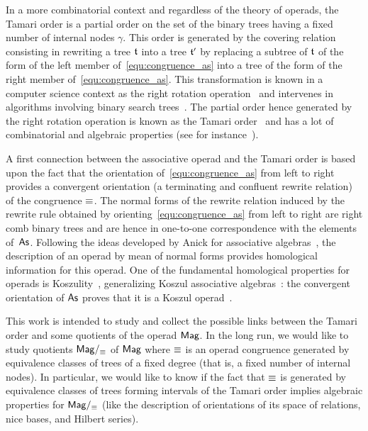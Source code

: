 In a more combinatorial context and regardless of the theory of operads,
the Tamari order is a partial order on the set of the binary trees
having a fixed number of internal nodes $\gamma$. This order is
generated by the covering relation consisting in rewriting a tree $\mathfrak{t}$
into a tree $\mathfrak{t}'$ by replacing a subtree of $\mathfrak{t}$ of the form of the
left member of~\eqref{equ:congruence_as} into a tree of the form of the
right member of~\eqref{equ:congruence_as}. This transformation is known
in a computer science context as the right rotation
operation~\cite{Knu98} and intervenes in algorithms involving binary
search trees~\cite{AVL62}. The partial order hence generated by the
right rotation operation is known as the Tamari order~\cite{Tam62} and
has a lot of combinatorial and algebraic properties (see for
instance~\cite{HT72,Cha06}).
\medbreak

A first connection between the associative operad and the Tamari order
is based upon the fact that the orientation of~\eqref{equ:congruence_as}
from left to right provides a convergent orientation (a terminating and
confluent rewrite relation) of the congruence $\operatorname{\equiv}$. The normal
forms of the rewrite relation induced by the rewrite rule obtained by
orienting~\eqref{equ:congruence_as} from left to right are right comb
binary trees and are hence in one-to-one correspondence with the
elements of~$\mathsf{As}$. Following the ideas developed by Anick for
associative algebras~\cite{Ani86}, the description of an operad by mean
of normal forms provides homological information for this operad. One of
the fundamental homological properties for operads is
Koszulity~\cite{GK94}, generalizing Koszul associative
algebras~\cite{Pri70}: the convergent orientation of $\mathsf{As}$ proves that
it is a Koszul operad~\cite{LV12}.
\medbreak

This work is intended to study and collect the possible links between
the Tamari order and some quotients of the operad $\mathsf{Mag}$. In the long
run, we would like to study quotients $\mathsf{Mag}/_{\operatorname{\equiv}}$ of $\mathsf{Mag}$ where
$\operatorname{\equiv}$ is an operad congruence generated by equivalence classes of
trees of a fixed degree (that is, a fixed number of internal nodes). In
particular, we would like to know if the fact that $\operatorname{\equiv}$ is generated
by equivalence classes of trees forming intervals of the Tamari order
implies algebraic properties for $\mathsf{Mag}/_{\operatorname{\equiv}}$ (like the description
of orientations of its space of relations, nice bases, and Hilbert
series).
\medbreak

